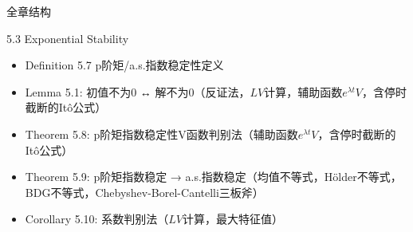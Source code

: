\documentclass[10pt,aspectratio=43]{beamer}
\begin{document}
\begin{frame}{全章结构}
\begin{table}[htbp]%
{}
\end{table}
\end{frame}

\begin{frame}{5.3 Exponential Stability}
\begin{itemize}
\item Definition 5.7 p阶矩/a.s.指数稳定性定义
\item Lemma 5.1: 初值不为0 ↔ 解不为0（反证法，$ LV $计算，辅助函数$ e^{\lambda t}V $，含停时截断的It\^o公式）
\item Theorem 5.8: p阶矩指数稳定性V函数判别法（辅助函数$ e^{\lambda t}V $，含停时截断的It\^o公式）
\item Theorem 5.9: p阶矩指数稳定 → a.s.指数稳定（均值不等式，H\"older不等式，BDG不等式，Chebyshev-Borel-Cantelli三板斧）
\item Corollary 5.10: 系数判别法（$ LV $计算，最大特征值）
\end{itemize}
\end{frame}
\end{document}
